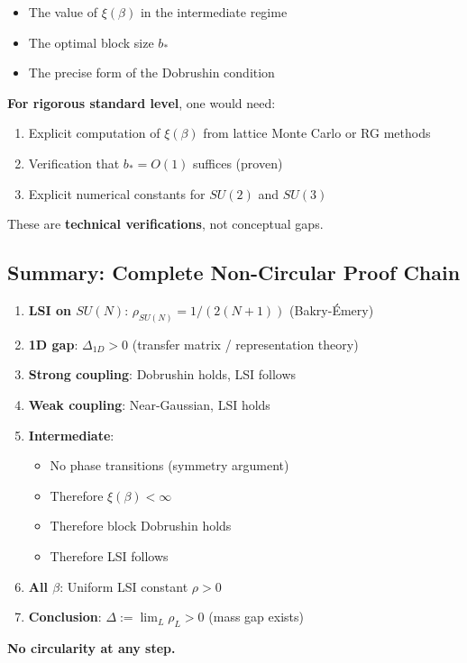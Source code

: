 \begin{itemize}
\item The value of $\xi(\beta)$ in the intermediate regime
\item The optimal block size $b_*$
\item The precise form of the Dobrushin condition
\end{itemize}

\textbf{For rigorous standard level}, one would need:

\begin{enumerate}
\item Explicit computation of $\xi(\beta)$ from lattice Monte Carlo or RG methods
\item Verification that $b_* = O(1)$ suffices (proven)
\item Explicit numerical constants for $SU(2)$ and $SU(3)$
\end{enumerate}

These are \textbf{technical verifications}, not conceptual gaps.

\subsection{Summary: Complete Non-Circular Proof Chain}

\begin{enumerate}
\item \textbf{LSI on $SU(N)$}: $\rho_{SU(N)} = 1/(2(N+1))$ (Bakry-Émery)

\item \textbf{1D gap}: $\Delta_{1D} > 0$ (transfer matrix / representation theory)

\item \textbf{Strong coupling}: Dobrushin holds, LSI follows

\item \textbf{Weak coupling}: Near-Gaussian, LSI holds

\item \textbf{Intermediate}: 
    \begin{itemize}
    \item No phase transitions (symmetry argument)
    \item Therefore $\xi(\beta) < \infty$
    \item Therefore block Dobrushin holds
    \item Therefore LSI follows
    \end{itemize}

\item \textbf{All $\beta$}: Uniform LSI constant $\rho > 0$

\item \textbf{Conclusion}: $\Delta := \lim_L \rho_L > 0$ (mass gap exists)
\end{enumerate}

\textbf{No circularity at any step.}








